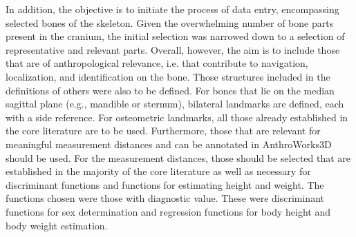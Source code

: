 \documentclass[sw]{iosart2x}
\newcommand{\aw}{AnthroWorks3D}
\begin{document}
In addition, the objective is to initiate the process of data entry, encompassing selected bones of the skeleton.
%
%
Given the overwhelming number of bone parts present in the cranium, the initial selection was narrowed down to a selection of representative and relevant parts.
Overall, however, the aim is to include those that are of anthropological relevance, i.e. that contribute to navigation, localization, and identification on the bone.
Those structures included in the definitions of others were also to be defined.
For bones that lie on the median sagittal plane (e.g., mandible or sternum), bilateral landmarks are defined, each with a side reference.
For osteometric landmarks, all those already established in the core literature are to be used.
Furthermore, those that are relevant for meaningful measurement distances and can be annotated in \aw{} should be used.
For the measurement distances, those should be selected that are established in the majority of the core literature as well as necessary for discriminant functions and functions for estimating height and weight.
The functions chosen were those with diagnostic value.
These were discriminant functions for sex determination and regression functions for body height and body weight estimation.
\end{document}
